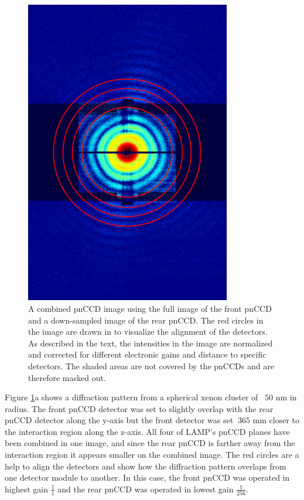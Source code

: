 \begin{figure}
	\centering
		\includegraphics[width=0.80\textwidth]{images/pnCCD-image-geometry.png}
	\caption{A combined pnCCD image using the full image of the front pnCCD and a down-sampled image of the rear pnCCD. The red circles in the image are drawn in to visualize the alignment of the detectors. As described in the text, the intensities in the image are normalized and corrected for different electronic gains and distance to specific detectors. The shaded areas are not covered by the pnCCDs and are therefore masked out.}
	\label{fig:pnCCD-image-geometry}
\end{figure}
Figure \ref{fig:pnCCD-image-geometry}a shows a diffraction pattern from a spherical xenon cluster of ~$50$ nm in radius. The front pnCCD detector was set to slightly overlap with the rear pnCCD detector along the y-axis but the front detector was set $~365$ mm closer to the interaction region along the z-axis. All four of LAMP's pnCCD planes have been combined in one image, and since the rear pnCCD is farther away from the interaction region it appears smaller on the combined image. The red circles are a help to align the detectors and show how the diffraction pattern overlaps from one detector module to another. In this case, the front pnCCD was operated in highest gain $\frac{1}{1}$ and the rear pnCCD was operated in lowest gain $\frac{1}{256}$.\\
